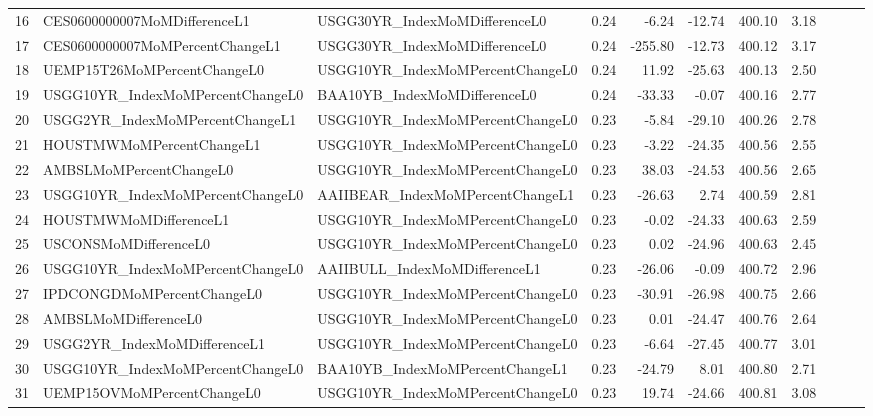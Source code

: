 \begin{longtable}{rllrrrrrlll}
  16 & CES0600000007MoMDifferenceL1 & USGG30YR\_IndexMoMDifferenceL0 & 0.24 & -6.24 & -12.74 & 400.10 & 3.18 &  &  &  \\ 
  17 & CES0600000007MoMPercentChangeL1 & USGG30YR\_IndexMoMDifferenceL0 & 0.24 & -255.80 & -12.73 & 400.12 & 3.17 &  &  &  \\ 
  18 & UEMP15T26MoMPercentChangeL0 & USGG10YR\_IndexMoMPercentChangeL0 & 0.24 & 11.92 & -25.63 & 400.13 & 2.50 &  &  &  \\ 
  19 & USGG10YR\_IndexMoMPercentChangeL0 & BAA10YB\_IndexMoMDifferenceL0 & 0.24 & -33.33 & -0.07 & 400.16 & 2.77 &  &  &  \\ 
  20 & USGG2YR\_IndexMoMPercentChangeL1 & USGG10YR\_IndexMoMPercentChangeL0 & 0.23 & -5.84 & -29.10 & 400.26 & 2.78 &  &  &  \\ 
  21 & HOUSTMWMoMPercentChangeL1 & USGG10YR\_IndexMoMPercentChangeL0 & 0.23 & -3.22 & -24.35 & 400.56 & 2.55 &  &  &  \\ 
  22 & AMBSLMoMPercentChangeL0 & USGG10YR\_IndexMoMPercentChangeL0 & 0.23 & 38.03 & -24.53 & 400.56 & 2.65 &  &  &  \\ 
  23 & USGG10YR\_IndexMoMPercentChangeL0 & AAIIBEAR\_IndexMoMPercentChangeL1 & 0.23 & -26.63 & 2.74 & 400.59 & 2.81 &  &  &  \\ 
  24 & HOUSTMWMoMDifferenceL1 & USGG10YR\_IndexMoMPercentChangeL0 & 0.23 & -0.02 & -24.33 & 400.63 & 2.59 &  &  &  \\ 
  25 & USCONSMoMDifferenceL0 & USGG10YR\_IndexMoMPercentChangeL0 & 0.23 & 0.02 & -24.96 & 400.63 & 2.45 &  &  &  \\ 
  26 & USGG10YR\_IndexMoMPercentChangeL0 & AAIIBULL\_IndexMoMDifferenceL1 & 0.23 & -26.06 & -0.09 & 400.72 & 2.96 &  &  &  \\ 
  27 & IPDCONGDMoMPercentChangeL0 & USGG10YR\_IndexMoMPercentChangeL0 & 0.23 & -30.91 & -26.98 & 400.75 & 2.66 &  &  &  \\ 
  28 & AMBSLMoMDifferenceL0 & USGG10YR\_IndexMoMPercentChangeL0 & 0.23 & 0.01 & -24.47 & 400.76 & 2.64 &  &  &  \\ 
  29 & USGG2YR\_IndexMoMDifferenceL1 & USGG10YR\_IndexMoMPercentChangeL0 & 0.23 & -6.64 & -27.45 & 400.77 & 3.01 &  &  &  \\ 
  30 & USGG10YR\_IndexMoMPercentChangeL0 & BAA10YB\_IndexMoMPercentChangeL1 & 0.23 & -24.79 & 8.01 & 400.80 & 2.71 &  &  &  \\ 
  31 & UEMP15OVMoMPercentChangeL0 & USGG10YR\_IndexMoMPercentChangeL0 & 0.23 & 19.74 & -24.66 & 400.81 & 3.08 &  &  &  \\ 

\end{longtable}
